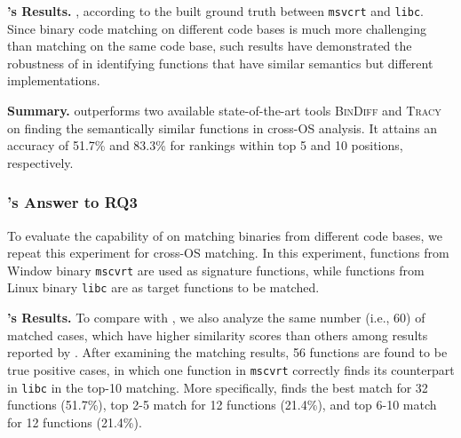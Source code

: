 \noindent\textbf{\tool's Results.} , according to the built ground truth between \texttt{msvcrt} and \texttt{libc}. 
Since binary code matching on different code bases is much more challenging than matching on the same code base, such results have demonstrated the robustness of \tool in identifying functions that have similar semantics but different implementations.

\noindent\textbf{Summary.} \tool outperforms two available state-of-the-art tools \textsc{\small BinDiff} and \textsc{\small Tracy} on finding the semantically similar functions in  cross-OS analysis. It attains an accuracy of 51.7\% and 83.3\% for rankings within top 5 and 10 positions, respectively.




\subsubsection{\toolNew's Answer to RQ3}

To evaluate the capability of \toolNew on matching binaries from different code bases, we repeat this experiment for cross-OS matching.
In this experiment, functions from Window binary \texttt{mscvrt} are used as signature functions, while functions from Linux binary \texttt{libc} are as target functions to be matched.

\noindent\textbf{\toolNew's Results.} To compare with \tool, we also analyze the same number (i.e., 60) of matched cases, which have higher similarity scores than others among results reported by \toolNew. After examining the matching results, 56 functions are found to be true positive cases, in which one function in \texttt{mscvrt} correctly finds its counterpart in \texttt{libc} in the top-10 matching. More specifically, \toolNew finds the best match for 32 functions (51.7\%), top 2-5 match for 12 functions (21.4\%), and top 6-10 match for 12 functions (21.4\%).

